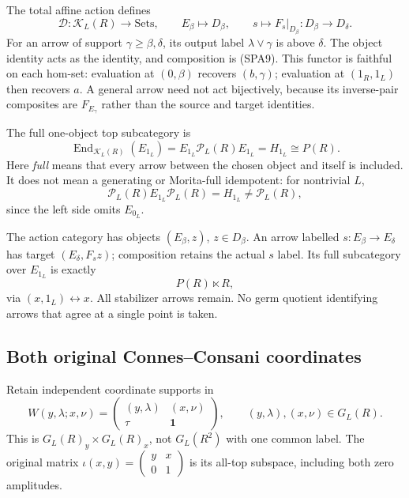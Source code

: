 The total affine action defines
\begin{equation}\tag{SPA16}
\mathcal D:\mathcal K_L(R)\to\mathrm{Sets},\qquad
E_\beta\mapsto D_\beta,\qquad
s\mapsto F_s|_{D_\beta}:D_\beta\to D_\delta.
\end{equation}
For an arrow of support $\gamma\ge\beta,\delta$, its output
label $\lambda\vee\gamma$ is above $\delta$. The object
identity acts as the identity, and composition is (SPA9).
This functor is faithful on each hom-set: evaluation at
$(0,\beta)$ recovers $(b,\gamma)$; evaluation at
$(1_R,1_L)$ then recovers $a$.
A general arrow need not act bijectively, because its
inverse-pair composites are $F_{E_\gamma}$ rather than
the source and target identities.

The full one-object top subcategory is
\begin{equation}\tag{SPA17}
\operatorname{End}_{\mathcal K_L(R)}(E_{1_L})
=E_{1_L}\mathcal P_L(R)E_{1_L}=H_{1_L}\cong P(R).
\end{equation}
Here \emph{full} means that every arrow between the chosen
object and itself is included. It does not mean a generating
or Morita-full idempotent: for nontrivial $L$,
\[
\mathcal P_L(R)E_{1_L}\mathcal P_L(R)=H_{1_L}
\ne\mathcal P_L(R),
\]
since the left side omits $E_{0_L}$.

The action category has objects $(E_\beta,z)$, $z\in D_\beta$.
An arrow labelled $s:E_\beta\to E_\delta$ has target
$(E_\delta,F_sz)$; composition retains the actual $s$ label.
Its full subcategory over $E_{1_L}$ is exactly
\begin{equation}\tag{SPA18}
P(R)\ltimes R,
\end{equation}
via $(x,1_L)\leftrightarrow x$. All stabilizer arrows remain.
No germ quotient identifying arrows that agree at a single
point is taken.

\subsection{Both original Connes--Consani coordinates}

Retain independent coordinate supports in
\begin{equation}\tag{SPA19}
W(y,\lambda;x,\nu)=
\begin{pmatrix}(y,\lambda)&(x,\nu)\\\tau&\mathbf1\end{pmatrix},
\qquad (y,\lambda),(x,\nu)\in G_L(R).
\end{equation}
This is $G_L(R)_y\times G_L(R)_x$, not $G_L(R^2)$ with
one common label. The original matrix
$\iota(x,y)=\left(\begin{smallmatrix}y&x\\0&1\end{smallmatrix}\right)$
is its all-top subspace, including both zero amplitudes.

